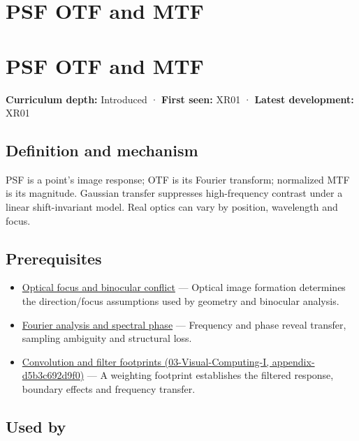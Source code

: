 \hypertarget{appendix-8b76b0efd27f}{}
\section*{PSF OTF and MTF}
\section{PSF OTF and MTF}\label{appendix-8b76b0efd27f-psf-otf-and-mtf}

\textbf{Curriculum depth:} Introduced · \textbf{First seen:} XR01 · \textbf{Latest development:} XR01

\subsection{Definition and mechanism}\label{appendix-8b76b0efd27f-definition-and-mechanism}

PSF is a point's image response; OTF is its Fourier transform; normalized MTF is its magnitude. Gaussian transfer suppresses high-frequency contrast under a linear shift-invariant model. Real optics can vary by position, wavelength and focus.

\subsection{Prerequisites}\label{appendix-8b76b0efd27f-prerequisites}

\begin{itemize}
\tightlist
\item
  \hyperref[appendix-f90cee1be7a4]{Optical focus and binocular conflict} --- Optical image formation determines the direction/focus assumptions used by geometry and binocular analysis.
\item
  \hyperref[appendix-b60686ba06a1]{Fourier analysis and spectral phase} --- Frequency and phase reveal transfer, sampling ambiguity and structural loss.
\item
  \href{../03-Visual-Computing-I/main.pdf\#nameddest=appendix-d5b3c692d9f0}{Convolution and filter footprints (03-Visual-Computing-I, appendix-d5b3c692d9f0)} --- A weighting footprint establishes the filtered response, boundary effects and frequency transfer.
\end{itemize}

\subsection{Used by}\label{appendix-8b76b0efd27f-used-by}

